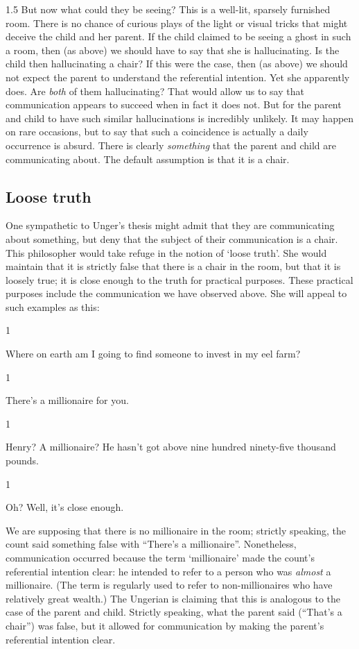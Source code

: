 \documentclass[11pt]{article}
\newcommand{\stage}[3]%
{%
	\begin{spacing}{1}%
	\vspace{0pt}
		\begin{description}[style=nextline, parsep=0pt, leftmargin=15mm, itemindent=-10mm, font=\mdseries]
			\item[\textsc{#1} \emph{#2}] #3
		\end{description}%
	\end{spacing}%
}
\begin{document}
\begin{spacing}{1.5}
But now what could they be seeing? This is a well-lit, sparsely furnished room. There is no chance of curious plays of the light or visual tricks that might deceive the child and her parent. If the child claimed to be seeing a ghost in such a room, then (as above) we should have to say that she is hallucinating. Is the child then hallucinating a chair? If this were the case, then (as above) we should not expect the parent to understand the referential intention. Yet she apparently does. Are {\em both} of them hallucinating? That would allow us to say that communication appears to succeed when in fact it does not. But for the parent and child to have such similar hallucinations is incredibly unlikely. It may happen on rare occasions, but to say that such a coincidence is actually a daily occurrence is absurd. There is clearly {\em something} that the parent and child are communicating about. The default assumption is that it is a chair.

\subsection{Loose truth}
\label{loose-u}
One sympathetic to Unger's thesis might admit that they are communicating about something, but deny that the subject of their communication is a chair. This philosopher would take refuge in the notion of `loose truth'. She would maintain that it is strictly false that there is a chair in the room, but that it is loosely true; it is close enough to the truth for practical purposes. These practical purposes include the communication we have observed above. She will appeal to such examples as this:

\stage{Countess}{}{Where on earth am I going to find someone to invest in my eel farm?}

\stage{Count}{(pointing)}{There's a millionaire for you.}

\stage{Countess}{(incredulous)}{Henry? A millionaire? He hasn't got above nine hundred ninety-five thousand pounds.}

\stage{Count}{}{Oh? Well, it's close enough.}

We are supposing that there is no millionaire in the room; strictly speaking, the count said something false with ``There's a millionaire''. Nonetheless, communication occurred because the term `millionaire' made the count's referential intention clear: he intended to refer to a person who was {\em almost} a millionaire. (The term is regularly used to refer to non-millionaires who have relatively great wealth.) The Ungerian is claiming that this is analogous to the case of the parent and child. Strictly speaking, what the parent said (``That's a chair'') was false, but it allowed for communication by making the parent's referential intention clear.


\end{spacing}
\end{document}
